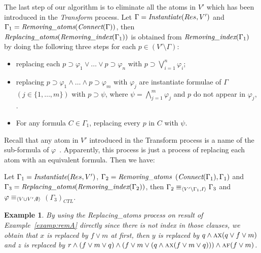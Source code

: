 \documentclass{article}
\newtheorem{example}{Example}
\begin{document}
The last step of our algorithm is to eliminate all the atoms in $V'$ which has been introduced in the \emph{Transform} process. Let $\Gamma=\emph{Instantiate}(Res, V')$ and $\Gamma_1=\emph{Removing\_atoms} (\emph{Connect}(\Gamma))$, then $\emph{Replacing\_atoms}(\emph{Removing\_index}(\Gamma_1))$ is obtained from $\emph{Removing\_index}(\Gamma_1)$ by doing the following three steps for each $p\in (V'\setminus \Gamma)$:
\begin{itemize}
  \item replacing each $p\supset \varphi_1\vee \dots \vee p \supset \varphi_n$ with $p \supset \bigvee_{i=1}^n \varphi_i$;
  \item replacing $p\supset \varphi_{1}\wedge \dots \wedge p \supset \varphi_{m}$ with $\varphi_j$ are instantiate formulae of  $\Gamma$ $(j \in \{1,\dots, m\})$ with $p \supset \psi$, where $\psi=\bigwedge_{j=1}^{m} \varphi_{j}$ and $p$ do not appear in $\varphi_j$, .
  \item For any formula $C\in \Gamma_1$, replacing every $p$ in $C$ with $\psi$.
\end{itemize}
Recall that any atom in $V'$ introduced in the Transform process is a name of the sub-formula of $\varphi$~\cite{bolotov2000clausal}. Apparently, this process is just a process of replacing each atom with an equivalent formula. Then we have:
\begin{proposition}\label{pro:replaceA}
Let $\Gamma_1=\emph{Instantiate}(Res, V')$, $\Gamma_2 =\emph{Removing\_atoms}$ $(\emph{Connect}(\Gamma_1), \Gamma_1)$ and $\Gamma_3 = \emph{Replacing\_atoms}(\emph{Removing\_index}(\Gamma_2))$, then $\Gamma_2  \equiv_{{\langle{V'\setminus \Gamma_1, I}\rangle}} \Gamma_3$ and $\varphi \equiv_{{\langle{V\cup V', \emptyset}\rangle}}$ $(\Gamma_3)_{CTL}$.
\end{proposition}
%


\begin{example}\label{exa:replace:sub}
By using the \emph{Replacing\_atoms} process on result of Example~\ref{examp:remA} directly since there is not index in those clauses, we obtain that $x$ is replaced by $f\vee m$ at first, then $y$ is replaced by $q \wedge \textsc{a}\textsc{x}(q \vee f\vee m)$ and $z$ is replaced by $r\wedge (f\vee m \vee q) \wedge (f\vee m \vee (q\wedge \textsc{a}\textsc{x}(f\vee m\vee q))) \wedge \textsc{a}\textsc{f}(f \vee m)$.
\end{example}
\end{document}
